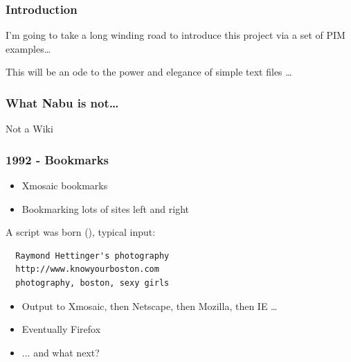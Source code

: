 \documentclass[compress,trans]{beamer}
\begin{document}
% 

\begin{frame}[fragile]
  \frametitle{Introduction}

  I'm going to take a long winding road to introduce this project via a set of
  PIM examples\dots

\vfill\pause

  This will be an ode to the power and elegance of simple text files \dots


\end{frame}


\begin{frame}[fragile]
  \frametitle{What Nabu is not\dots}

Not a Wiki



\end{frame}


\begin{frame}[fragile]
  \frametitle{1992 - Bookmarks}

  \begin{itemize}
    \item Xmosaic bookmarks
    \item Bookmarking lots of sites left and right
  \end{itemize}

\pause
A script was born (\verb@bmmgr@), typical input:


\begin{verbatim}
  Raymond Hettinger's photography
  http://www.knowyourboston.com
  photography, boston, sexy girls
\end{verbatim}

  \begin{itemize}
    \item Output to Xmosaic, then Netscape, then Mozilla, then IE \dots
    \item Eventually Firefox
    \item ... and what next?
  \end{itemize}


\end{frame}
\end{document}
